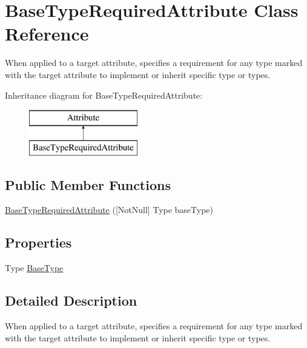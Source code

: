 \hypertarget{class_base_type_required_attribute}{}\section{Base\+Type\+Required\+Attribute Class Reference}
\label{class_base_type_required_attribute}


When applied to a target attribute, specifies a requirement for any type marked with the target attribute to implement or inherit specific type or types.  


Inheritance diagram for Base\+Type\+Required\+Attribute\+:\begin{figure}[H]
\begin{center}
\leavevmode
\includegraphics[height=2.000000cm]{class_base_type_required_attribute}
\end{center}
\end{figure}
\subsection*{Public Member Functions}
\begin{DoxyCompactItemize}
\item 
\hyperlink{class_base_type_required_attribute_a3b535405fd33291328613b6ede4e5d8a}{Base\+Type\+Required\+Attribute} (\mbox{[}Not\+Null\mbox{]} Type base\+Type)
\end{DoxyCompactItemize}
\subsection*{Properties}
\begin{DoxyCompactItemize}
\item 
Type \hyperlink{class_base_type_required_attribute_abd32451b36cd8eff34ecee4718e78f5b}{Base\+Type}
\end{DoxyCompactItemize}


\subsection{Detailed Description}
When applied to a target attribute, specifies a requirement for any type marked with the target attribute to implement or inherit specific type or types. 


